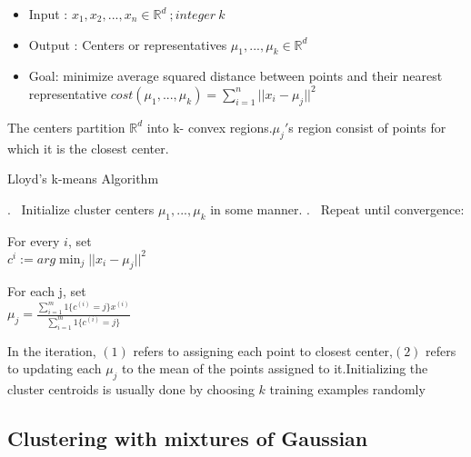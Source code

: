 \documentclass[12pt]{article}
\begin{document}
 \begin{itemize}
 	\item Input : $x_{1}, x_{2}, ... , x_{n} \in \mathbb{R}^{d} \ ; integer \ k$
 	\item Output : Centers or representatives $\mu_{1},...,\mu_{k} \in \mathbb{R} ^{d}$
 	\item Goal: minimize average squared distance between points and their nearest representative  $ cost(\mu_{1},...,\mu_{k}) = \sum_{i=1}^{n} \vert \vert x_{i} - \mu_{j} \vert \vert ^{2} $
 \end{itemize}
The centers partition $\mathbb{R}^{d}$ into k- convex regions.$\mu_{j}'$s region consist of points for which it is the closest center.



 \begin{algorithm}
 	
 	\caption*{Lloyd's k-means Algorithm} \label{alg:MyAlgorithm}
 	\begin{algorithmic}
 		
 		. \ Initialize cluster centers $\mu_{1},...,\mu_{k}$ in some manner.
 		. \ Repeat until convergence:
 		
 		
 		
 		
 		
 		\STATE \hspace{ 0.8cm} For every $i$, set  \\  \hspace{4cm}$c^{i} := arg \min_{j}   \vert \vert x_{i} - \mu_{j} \vert \vert ^{2} $
 		
 		\STATE \hspace{ 0.8cm} For each j, set \\  \hspace{4 cm}$\mu_{j} = \frac{\sum_{i=1}^{m} 1 \{c^{(i)}=j\}x^{(i)}}{\sum_{i=1}^{m} 1 \{c^{(i)}=j\}}$
 		
 		
 		
 		
 		
 	\end{algorithmic}
 \end{algorithm}
 
 
 
In the iteration, $(1)$ refers to assigning each point to closest center,$(2)$ refers to updating each $\mu_{j}$ to the mean of the points assigned to it.Initializing the cluster centroids is usually done by choosing $k$ training examples randomly
 
 
  

 \subsection{Clustering with mixtures of Gaussian}
 
\end{document}
